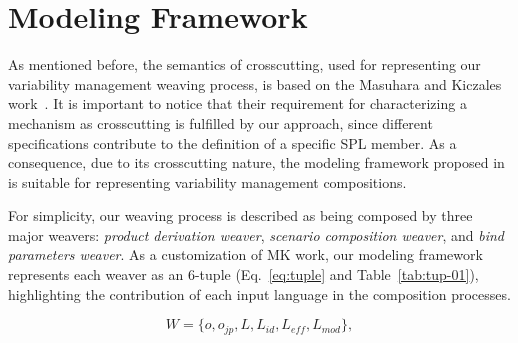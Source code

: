 \documentclass[11pt]{report}
\begin{document}
% 




\section{Modeling Framework}\label{sub:modeling-framework}

As mentioned before, the semantics of crosscutting, used for representing our variability management weaving process, is based on the Masuhara and Kiczales work~\cite{kiczales-ecoop-2003}. 
It is important to notice that their requirement for characterizing a mechanism as crosscutting is fulfilled by our approach, since different specifications contribute to the definition of a specific SPL member. As a consequence, due to its crosscutting nature, the modeling framework proposed in~\cite{kiczales-ecoop-2003}  is suitable for representing variability management compositions. 

For simplicity, our weaving process is described as being composed by three major weavers: \emph{product derivation weaver}, \emph{scenario composition weaver}, and \emph{bind parameters weaver}. As a customization of MK work, our modeling framework represents each weaver as an 6-tuple (Eq.~\ref{eq:tuple} and Table~\ref{tab:tup-01}), highlighting the contribution of each input language in the composition processes. 

\begin{equation}
W = \{o, o_{jp}, L, L_{id}, L_{eff}, L_{mod}\}, 
\label{eq:tuple}
\end{equation}
\end{document}
